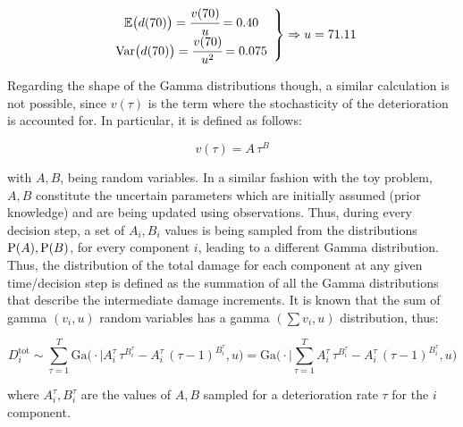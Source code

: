 \begin{equation}
    \left.
    \begin{array}{cc}
        \mathbb{E}\big ( d(70) \big ) = \cfrac{v(70)}{u} = 0.40  \\
        \mathrm{Var} \big ( d(70) \big ) = \cfrac{v(70)}{u^2} = 0.075
    \end{array}
    \right\}
    \Rightarrow u = 71.11
\end{equation}

Regarding the shape of the Gamma distributions though, a similar calculation is not possible, since $v(\tau)$ is the term where the stochasticity of the deterioration is accounted for. In particular, it is defined as follows:

\begin{equation}
    v(\tau) = A\,\tau ^B
\end{equation}

with $A, B$, being random variables. In a similar fashion with the toy problem, $A, B$ constitute the uncertain parameters which are initially assumed (prior knowledge) and are being updated using observations. Thus, during every decision step, a set of $A_i, B_i$ values is being sampled from the distributions $\text{P}(A), \text{P}(B)$, for every component $i$, leading to a different Gamma distribution. Thus, the distribution of the total damage for each component at any given time/decision step is defined as the summation of all the Gamma distributions that describe the intermediate damage increments. It is known that the sum of gamma $(v_i, u)$ random variables has a gamma $(\sum v_i, u)$ distribution, thus:

\begin{equation}
    D_i^{\text{tot}} \sim \sum_{\tau = 1} ^T \mathrm{Ga} \big(\cdot \mid A^{\tau}_i \, \tau ^{B^{\tau}_i} - A^{\tau}_i \, (\tau - 1) ^{B^{\tau}_i}, u\big) = \mathrm{Ga} \big(\cdot \mid \sum_{\tau = 1} ^T A^{\tau}_i \, \tau ^{B^{\tau}_i} - A^{\tau}_i \, (\tau - 1) ^{B^{\tau}_i}, u\big)
\end{equation}

where $A^{\tau}_i, B^{\tau}_i$ are the values of $A, B$ sampled for a deterioration rate $\tau$ for the $i$ component\footnotemark.\\


